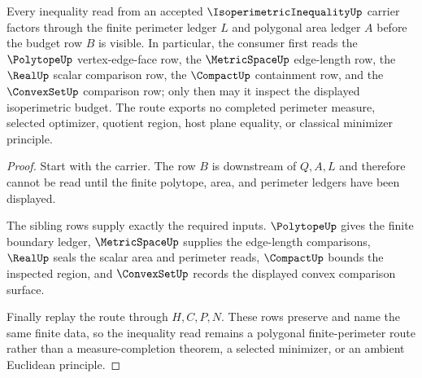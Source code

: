 \begin{theorem}
\label{thm:isoperimetric-inequality-finite-perimeter-route}
Every inequality read from an accepted $\IsoperimetricInequalityUp$ carrier factors through the finite perimeter ledger $L$ and polygonal area ledger $A$ before the budget row $B$ is visible. In particular, the consumer first reads the $\PolytopeUp$ vertex-edge-face row, the $\MetricSpaceUp$ edge-length row, the $\RealUp$ scalar comparison row, the $\CompactUp$ containment row, and the $\ConvexSetUp$ comparison row; only then may it inspect the displayed isoperimetric budget. The route exports no completed perimeter measure, selected optimizer, quotient region, host plane equality, or classical minimizer principle.
\end{theorem}
\begin{proof}
Start with the carrier. The row $B$ is downstream of $Q,A,L$ and therefore cannot be read until the finite polytope, area, and perimeter ledgers have been displayed.

The sibling rows supply exactly the required inputs. $\PolytopeUp$ gives the finite boundary ledger, $\MetricSpaceUp$ supplies the edge-length comparisons, $\RealUp$ seals the scalar area and perimeter reads, $\CompactUp$ bounds the inspected region, and $\ConvexSetUp$ records the displayed convex comparison surface.

Finally replay the route through $H,C,P,N$. These rows preserve and name the same finite data, so the inequality read remains a polygonal finite-perimeter route rather than a measure-completion theorem, a selected minimizer, or an ambient Euclidean principle.
\end{proof}


\begin{closurestatus}{\IsoperimetricInequalityUp}
  \theoryclosure{\seedClosure}
  \formalstatus{\unformalizedV}
\end{closurestatus}
